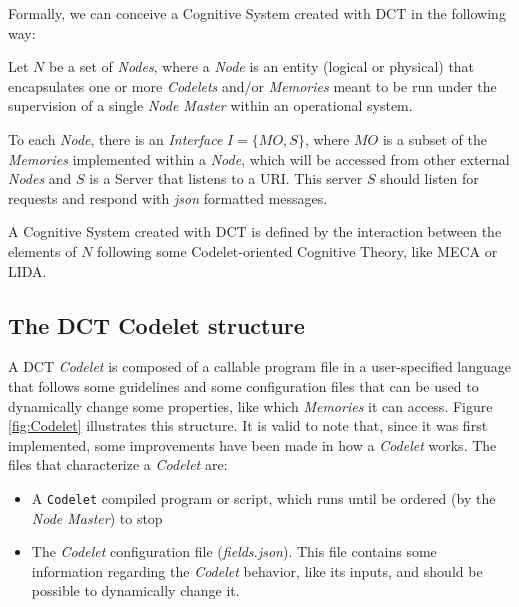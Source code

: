 Formally, we can conceive a Cognitive System created with DCT in the following way:


\begin{definition}

Let $N$ be a set of \emph{Nodes}, where a \emph{Node} is an entity (logical or physical) that encapsulates one or more \emph{Codelets} and/or \emph{Memories} meant to be run under the supervision of a single \emph{Node Master} within an operational system.

To each \emph{Node}, there is an \emph{Interface} $I = \{MO, S\}$, where $MO$ is a subset of the \emph{Memories} implemented within a \emph{Node}, which will be accessed from other external \emph{Nodes} and $S$ is a Server that listens to a URI. This server $S$ should listen for requests and respond with \emph{json} formatted messages.


A Cognitive System created with DCT is defined by the interaction between the elements of $N$ following some Codelet-oriented Cognitive Theory, like MECA or LIDA.
\end{definition}






\subsection{The DCT Codelet structure}
\label{sec:dct_Codelet}


A DCT \emph{Codelet} is composed of a callable program file in a user-specified language that follows some guidelines and some configuration files that can be used to dynamically change some properties, like which \emph{Memories} it can access. Figure \ref{fig:Codelet} illustrates this structure. It is valid to note that, since it was first implemented, some improvements have been made in how a \emph{Codelet} works. The files that characterize a \emph{Codelet} are:


\begin{itemize}
\item A \verb!Codelet! compiled program or script, which runs until be ordered (by the \emph{Node Master}) to stop
\item The \emph{Codelet} configuration file (\emph{fields.json}). This file contains some information regarding the \emph{Codelet} behavior, like its inputs, and should be possible to dynamically change it.
\end{itemize}

